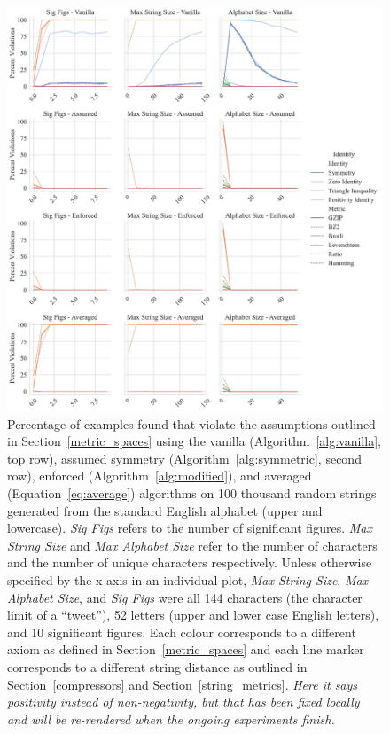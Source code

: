 \documentclass[preprint,12pt]{elsarticle}
\newcommand{\cm}[1]{\textit{{\color{blue}#1}}}
\begin{document}
\begin{figure}
    \centering
    \includegraphics[width=\textwidth]{images/synthetic_check.pdf}
    \caption{
    Percentage of examples found that violate the assumptions outlined in Section~\ref{metric_spaces} using the vanilla (Algorithm~\ref{alg:vanilla}, top row), assumed symmetry (Algorithm~\ref{alg:symmetric}, second row), enforced (Algorithm~\ref{alg:modified}), and averaged (Equation~\ref{eq:average}) algorithms on 100 thousand random strings generated from the standard English alphabet (upper and lowercase). 
    \textit{Sig Figs} refers to the number of significant figures. \textit{Max String Size} and \textit{Max Alphabet Size} refer to the number of characters and the number of unique characters respectively. 
    Unless otherwise specified by the x-axis in an individual plot, \textit{Max String Size}, \textit{Max Alphabet Size}, and \textit{Sig Figs} were all 144 characters (the character limit of a ``tweet''), 52 letters (upper and lower case English letters), and 10 significant figures. Each colour corresponds to a different axiom as defined in Section~\ref{metric_spaces} and each line marker corresponds to a different string distance as outlined in Section~\ref{compressors} and Section~\ref{string_metrics}. \cm{Here it says positivity instead of non-negativity, but that has been fixed locally and will be re-rendered when the ongoing experiments finish.}
    }
    \label{fig:synthetic_check}
\end{figure}
\end{document}
